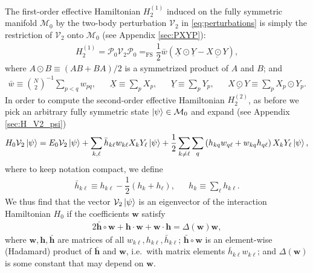 \documentclass[nofootinbib,notitlepage,11pt]{revtex4-2}
\newcommand{\f}[2]{\dfrac{#1}{#2}} %
\newcommand{\p}[1]{\left(#1\right)} %
\renewcommand{\c}{\cdot} %
\newcommand{\m}{\bm} %
\newcommand{\1}{\mathds{1}}
\newcommand{\M}{\mathcal{M}}
\renewcommand{\P}{\mathcal{P}}
\newcommand{\V}{\mathcal{V}}
\newcommand{\EQFS}{=_{\text{FS}}}
\newcommand{\col}{\underline}
\begin{document}
The first-order effective Hamiltonian $H_2^{(1)}$ induced on the fully
symmetric manifold $\M_0$ by the two-body perturbation $\V_2$ in
\eqref{eq:perturbations} is simply the restriction of $\V_2$ onto
$\M_0$ (see Appendix \ref{sec:PXYP}):
\begin{align}
  H_2^{(1)}
  = \P_0 \V_2 \P_0
  \EQFS \f12 \bar w \p{\col{X}\odot\col{Y} - \col{X\odot Y}},
\end{align}
where $A\odot B\equiv\p{AB+BA}/2$ is a symmetrized product of $A$ and
$B$; and
\begin{align}
  \bar w \equiv {N\choose 2}^{-1} \sum_{p<q} w_{pq},
  &&
  \col{X} \equiv \sum_p X_p,
  &&
  \col{Y} \equiv \sum_p Y_p,
  &&
  \col{X\odot Y} \equiv \sum_p X_p\odot Y_p.
\end{align}
In order to compute the second-order effective Hamiltonian
$H_2^{(2)}$, as before we pick an arbitrary fully symmetric state
$\ket\psi\in\M_0$ and expand (see Appendix \ref{sec:H_V2_psi})
\begin{align}
  H_0 \V_2 \ket\psi
  = E_0 \V_2 \ket\psi
  + \sum_{k,\ell} \bar h_{k\ell} w_{k\ell} X_k Y_\ell \ket\psi
  + \f12 \sum_{k\ne\ell} \sum_q \p{h_{kq} w_{q\ell} + w_{kq} h_{q\ell}}
  X_k Y_\ell \ket\psi,
  \label{eq:H_V2_psi}
\end{align}
where to keep notation compact, we define
\begin{align}
  \bar h_{k\ell} \equiv h_{k\ell} - \f12\p{h_k + h_\ell},
  &&
  h_k \equiv \sum_\ell h_{k\ell}.
\end{align}
We thus find that the vector $\V_2\ket\psi$ is an eigenvector of the
interaction Hamiltonian $H_0$ if the coefficients $\m w$ satisfy
\begin{align}
  2\bar{\m h} \circ \m w + \m h\c\m w + \m w\c\m h
  = \Delta\p{\m w} \m w,
  \label{eq:cond_2}
\end{align}
where $\m w,\m h,\bar{\m h}$ are matrices of all
$w_{k\ell},h_{k\ell},\bar h_{k\ell}$; $\bar{\m h} \circ \m w$ is an
element-wise (Hadamard) product of $\bar{\m h}$ and $\m w$, i.e.~with
matrix elements $\bar h_{k\ell} w_{k\ell}$; and $\Delta\p{\m w}$ is
some constant that may depend on $\m w$.
\end{document}
